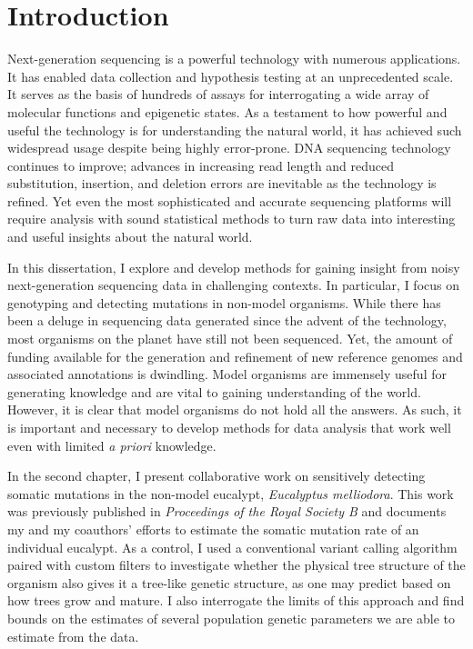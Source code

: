 \chapter{Introduction}



Next-generation sequencing is a powerful technology with numerous applications. It has enabled data collection and hypothesis testing at an unprecedented scale. It serves as the basis of hundreds of assays for interrogating a wide array of molecular functions and epigenetic states. As a testament to how powerful and useful the technology is for understanding the natural world, it has achieved such widespread usage despite being highly error-prone. DNA sequencing technology continues to improve; advances in increasing read length and reduced substitution, insertion, and deletion errors are inevitable as the technology is refined. Yet even the most sophisticated and accurate sequencing platforms will require analysis with sound statistical methods to turn raw data into interesting and useful insights about the natural world.

In this dissertation, I explore and develop methods for gaining insight from noisy next-generation sequencing data in challenging contexts. In particular, I focus on genotyping and detecting mutations in non-model organisms. While there has been a deluge in sequencing data generated since the advent of the technology, most organisms on the planet have still not been sequenced. Yet, the amount of funding available for the generation and refinement of new reference genomes and associated annotations is dwindling. Model organisms are immensely useful for generating knowledge and are vital to gaining understanding of the world. However, it is clear that model organisms do not hold all the answers. As such, it is important and necessary to develop methods for data analysis that work well even with limited \textit{a priori} knowledge.

In the second chapter, I present collaborative work on sensitively detecting somatic mutations in the non-model eucalypt, \textit{Eucalyptus melliodora}. This work was previously published in \textit{Proceedings of the Royal Society B} and documents my and my coauthors' efforts to estimate the somatic mutation rate of an individual eucalypt. As a control, I used a conventional variant calling algorithm paired with custom filters to investigate whether the physical tree structure of the organism also gives it a tree-like genetic structure, as one may predict based on how trees grow and mature. I also interrogate the limits of this approach and find bounds on the estimates of several population genetic parameters we are able to estimate from the data.

